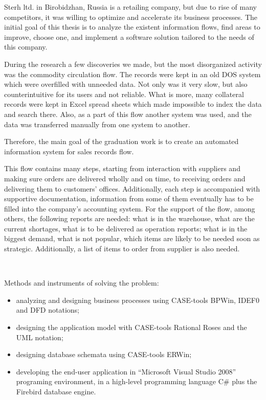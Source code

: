 \documentclass[a4paper, 12pt]{article}
\begin{document}
Sterh ltd. in Birobidzhan, Russia is a retailing company, but due to rise of many competitors, it was willing to optimize and accelerate its business processes. The initial goal of this thesis is to analyze the existent information flows, find areas to improve, choose one, and implement a software solution tailored to the needs of this company.

During the research a few discoveries we made, but the most disorganized activity was the commodity circulation flow. The records were kept in an old DOS system which were overfilled with unneeded data. Not only was it very slow, but also counterintuitive for its users and not reliable. What is more, many collateral records were kept in Excel spread sheets which made impossible to index the data and search there. Also, as a part of this flow another system was used, and the data was transferred manually from one system to another.

Therefore, the main goal of the graduation work is to create an automated information system for sales records flow.

This flow contains many steps, starting from interaction with suppliers and making sure orders are delivered wholly and on time, to receiving orders and delivering them to customers' offices. Additionally, each step is accompanied with supportive documentation, information from some of them eventually has to be filled into the company's accounting system. For the support of the flow, among others, the following reports are needed: what is in the warehouse, what are the current shortages, what is to be delivered as operation reports; what is in the biggest demand, what is not popular, which items are likely to be needed soon as strategic. Additionally, a list of items to order from supplier is also needed.

\

Methods and instruments of solving the problem:

\begin{itemize}
\itemsep0pt
\item analyzing and designing business processes using CASE-tools BPWin, IDEF0 and DFD notations;
\item designing the application model with CASE-tools Rational Roses and the UML notation;
\item designing database schemata using CASE-tools ERWin;
\item developing the end-user application in ``Microsoft Visual Studio 2008'' programing environment, in a high-level programming language C\# plus the Firebird database engine.
\end{itemize}
\end{document}
